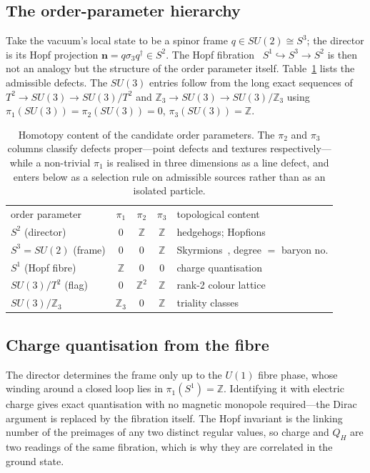 \documentclass[aps,prd,preprint,nofootinbib,longbibliography]{revtex4-2}
\newcommand{\nv}{\bm{n}}
\newcommand{\Qh}{Q_H}
\begin{document}
\subsection{The order-parameter hierarchy}

Take the vacuum's local state to be a spinor frame $q\in SU(2)\cong S^3$; the
director is its Hopf projection $\nv=q\sigma_3q^\dagger\in S^2$. The Hopf
fibration~\cite{hopf1931} $S^1\hookrightarrow S^3\to S^2$ is then not an analogy
but the structure of the order parameter itself. Table~\ref{tab:homotopy} lists
the admissible defects. The $SU(3)$ entries follow from the long exact sequences
of $T^2\to SU(3)\to SU(3)/T^2$ and
$\mathbb{Z}_3\to SU(3)\to SU(3)/\mathbb{Z}_3$ using
$\pi_1(SU(3))=\pi_2(SU(3))=0$, $\pi_3(SU(3))=\mathbb{Z}$.

\begin{table}[t]
\caption{Homotopy content of the candidate order parameters. The $\pi_2$ and
$\pi_3$ columns classify defects proper---point defects and textures
respectively---while a non-trivial $\pi_1$ is realised in three dimensions as a
line defect, and enters below as a selection rule on admissible sources rather
than as an isolated particle.}
\label{tab:homotopy}
\begin{ruledtabular}
\begin{tabular}{lcccl}
order parameter & $\pi_1$ & $\pi_2$ & $\pi_3$ & topological content \\
\colrule
$S^2$ (director)     & $0$ & $\mathbb{Z}$ & $\mathbb{Z}$ & hedgehogs; Hopfions \\
$S^3=SU(2)$ (frame)  & $0$ & $0$ & $\mathbb{Z}$ & Skyrmions~\cite{skyrme1961}, degree $=$ baryon no. \\
$S^1$ (Hopf fibre)   & $\mathbb{Z}$ & $0$ & $0$ & charge quantisation \\
$SU(3)/T^2$ (flag)   & $0$ & $\mathbb{Z}^2$ & $\mathbb{Z}$ & rank-2 colour lattice \\
$SU(3)/\mathbb{Z}_3$ & $\mathbb{Z}_3$ & $0$ & $\mathbb{Z}$ & triality classes \\
\end{tabular}
\end{ruledtabular}
\end{table}

\subsection{Charge quantisation from the fibre}

The director determines the frame only up to the $U(1)$ fibre phase, whose
winding around a closed loop lies in $\pi_1(S^1)=\mathbb{Z}$. Identifying it with
electric charge gives exact quantisation with no magnetic monopole required---the
Dirac argument is replaced by the fibration itself. The Hopf invariant is the
linking number of the preimages of any two distinct regular values, so charge and
$\Qh$ are two readings of the same fibration, which is why they are correlated in
the ground state.
\end{document}
